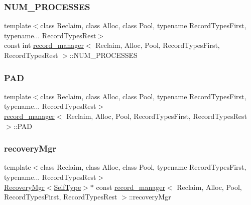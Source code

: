 \subsubsection{\texorpdfstring{N\+U\+M\+\_\+\+P\+R\+O\+C\+E\+S\+S\+ES}{NUM\_PROCESSES}}
{\footnotesize\ttfamily template$<$class Reclaim, class Alloc, class Pool, typename Record\+Types\+First, typename... Record\+Types\+Rest$>$ \\
const int \hyperlink{classrecord__manager}{record\+\_\+manager}$<$ Reclaim, Alloc, Pool, Record\+Types\+First, Record\+Types\+Rest $>$\+::N\+U\+M\+\_\+\+P\+R\+O\+C\+E\+S\+S\+ES}

\mbox{\label{classrecord__manager_aa7a4191bd0edf5034564e41b205bcc15}} 
\subsubsection{\texorpdfstring{P\+AD}{PAD}}
{\footnotesize\ttfamily template$<$class Reclaim, class Alloc, class Pool, typename Record\+Types\+First, typename... Record\+Types\+Rest$>$ \\
\hyperlink{classrecord__manager}{record\+\_\+manager}$<$ Reclaim, Alloc, Pool, Record\+Types\+First, Record\+Types\+Rest $>$\+::P\+AD\hspace{0.3cm}{\ttfamily [protected]}}

\mbox{\label{classrecord__manager_a8ac6e466002b613f70297007ca287c9d}} 
\subsubsection{\texorpdfstring{recovery\+Mgr}{recoveryMgr}}
{\footnotesize\ttfamily template$<$class Reclaim, class Alloc, class Pool, typename Record\+Types\+First, typename... Record\+Types\+Rest$>$ \\
\hyperlink{classRecoveryMgr}{Recovery\+Mgr}$<$\hyperlink{classrecord__manager_a294739c32aa84eb40b32090b45fdc137}{Self\+Type}$>$$\ast$ const \hyperlink{classrecord__manager}{record\+\_\+manager}$<$ Reclaim, Alloc, Pool, Record\+Types\+First, Record\+Types\+Rest $>$\+::recovery\+Mgr}

\mbox{\label{classrecord__manager_a24c980c71ad23298822a4a35a6433d63}} 
